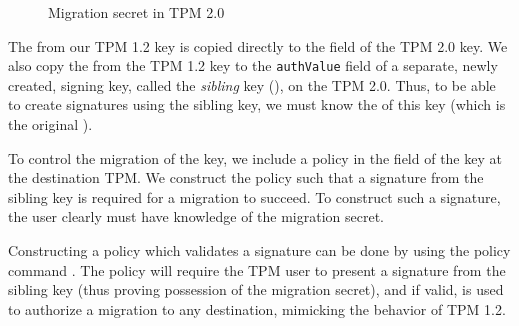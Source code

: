 {\begin{figure}[htbp]
	\caption{Migration secret in TPM 2.0}
	\label{fig:migauthsibling}
\end{figure}

The  from our TPM 1.2 key is copied directly to the  field of the TPM 2.0 key. We also copy the  from the TPM 1.2 key to the \texttt{authValue} field of a separate, newly created, signing key, called the \emph{sibling} key (\eksib{}), on the TPM 2.0. Thus, to be able to create signatures using the sibling key, we must know the  of this key (which is the original ).

To control the migration of the key, we include a policy in the  field of the key \ek{} at the destination TPM. We construct the policy such that a signature from the sibling key is required for a migration to succeed. To construct such a signature, the user clearly must have knowledge of the migration secret.

Constructing a policy which validates a signature can be done by using the policy command . The policy will require the TPM user to present a signature from the sibling key (thus proving possession of the migration secret), and if valid,   is used to authorize a migration to any destination, mimicking the behavior of TPM 1.2.

}

